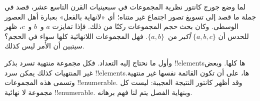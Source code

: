 \documentclass[../../../include/open-logic-section]{subfiles}
\begin{document}


لما وضع جورج كانتور نظرية المجموعات في سبعينيات القرن التاسع عشر،
قصد في جملة ما قصد إلى تسويغ تصور اجتماع غير متناه؛ أي «لانهاية
بالفعل» بعبارة أهل العصور الوسطى. وكان بحث \emph{حجم} المجموعات
ركنًا من ذلك. فإذا تمايزت $a$ و~$b$ و~$c$، ظهر للحدس أن
$\{a, b, c\}$ \emph{أكبر} من~$\{a, b\}$. فهل المجموعات
اللانهائية كلها سواء في الحجم؟ سيتبين أن الأمر ليس كذلك.

وأول ما نحتاج إليه التعداد. فكل مجموعة منتهية تسرد بذكر
!!{element}sها كلها. وبعض غير المنتهيات كذلك يمكن سرد
!!{element}sها، على أن تكون القائمة نفسها غير منتهية. وتسمى هذه المجموعات !!{enumerable}. وقد أظهر كانتور النتيجة العجيبة: ليست كل
مجموعة لا نهائية !!{enumerable}. وبنهاية الفصل يتم لنا فهم برهانه.
\end{document}
